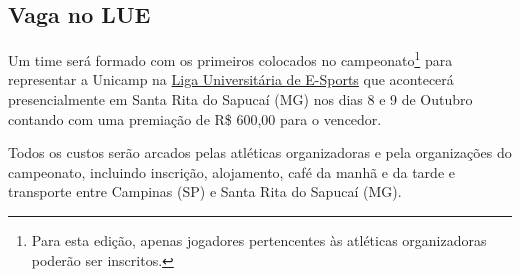 \subsection{Vaga no LUE}

Um time será formado com os primeiros colocados no campeonato\footnote{Para esta edição, apenas jogadores pertencentes às atléticas organizadoras poderão ser inscritos.} para representar a Unicamp na \href{http://luebrasil.com.br}{Liga Universitária de E-Sports} que acontecerá presencialmente em Santa Rita do Sapucaí (MG) nos dias 8 e 9 de Outubro contando com uma premiação de R\$ 600,00 para o vencedor.

Todos os custos serão arcados pelas atléticas organizadoras e pela organizações do campeonato, incluindo inscrição, alojamento, café da manhã e da tarde e transporte entre Campinas (SP) e Santa Rita do Sapucaí (MG).